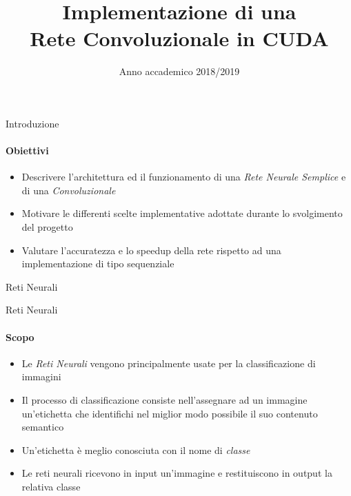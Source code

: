\documentclass[
 ]{beamer}
\author {
            \hspace*{0.01em}{\Large Nicholas Aspes}
        }
\begin{document}

\title{Implementazione di una \\ 
       Rete Convoluzionale in CUDA \bigskip}
        
\date{\Large Anno accademico 2018/2019}


     
\begin{frame}
\maketitle
\end{frame}



\begin{frame}{Introduzione}
    \framesubtitle{Obiettivi}  
    
    \begin{itemize} [<+->]
        \setlength\itemsep{3em}
        \item \large Descrivere l'architettura ed il funzionamento di una \emph{Rete Neurale Semplice} e di una \emph{Convoluzionale}
        \item \large Motivare le differenti scelte implementative adottate durante lo svolgimento del progetto
        \item \large Valutare l'accuratezza e lo speedup della rete rispetto ad una implementazione di tipo sequenziale       
    \end{itemize}  
\end{frame}



\begin{frame}[c]
  \centering
  \bigskip \bigskip    
  \Huge Reti Neurali
\end{frame}

\begin{frame}{Reti Neurali}
    \framesubtitle{Scopo}
    \begin{itemize} [<+->]
        \setlength\itemsep{2em}
        \item \large Le \emph{Reti Neurali} vengono principalmente usate per la classificazione di immagini
       \item \large Il processo di classificazione consiste nell'assegnare ad un immagine un'etichetta che identifichi nel miglior modo possibile il suo contenuto semantico
       \item \large Un'etichetta è meglio conosciuta con il nome di \emph{classe}
       \item \large Le reti neurali ricevono in input un'immagine e restituiscono in output la relativa classe 
    \end{itemize}
\end{frame} 
\end{document}
